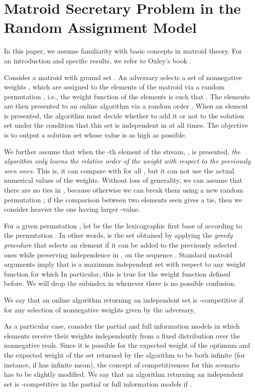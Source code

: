 \documentclass[letterpaper,11pt]{article}
\theoremstyle{definition}
\theoremstyle{remark}
\begin{document}
\section{Matroid Secretary Problem in the Random Assignment Model}\label{section2}

In this paper, we assume familiarity with basic concepts in matroid theory. For an introduction and specific results, we refer to Oxley's book \cite{oxley2006matroid}.

Consider a matroid  with ground set . An adversary selects a set  of  nonnegative weights , which are assigned to the elements of the matroid via a random permutation , i.e., the weight function of the elements  is such that . The elements are then presented to an online algorithm via a random order . When an element is presented, the algorithm must decide whether to add it or not to the solution set under the condition that this set is independent in  at all times. The objective is to output a solution set  whose value  is as high as possible.

We further assume that when the -th element of the stream, , is presented, \emph{the algorithm only learns the relative order of the weight with respect to the previously seen ones}. This is, it can compare  with  for all , but it can not use the actual numerical values of the weights. Without loss of generality, we can assume that there are no ties in , because otherwise we can break them using a new random permutation ; if the comparison between two elements seen gives a tie, then we consider heavier the one having larger -value.

For a given permutation , let  be the the lexicographic first base of  according to the permutation . In other words,  is the set obtained by applying the \emph{greedy procedure} that selects an element if it can be added to the previously selected ones while preserving independence in , on the sequence . Standard matroid arguments imply that  is a maximum independent set with respect to any weight function  for which  In particular, this is true for the weight function  defined before. We will drop the subindex  in  whenever there is no possible confusion.

We say that an online algorithm returning an independent set  is -competitive if for any selection of nonnegative weights  given by the adversary, 


As a particular case, consider the partial and full information models in which elements receive their weights independently from a fixed distribution  over the nonnegative reals. Since it is possible for the expected weight of the optimum and the expected weight of the set returned by the algorithm to be both infinite (for instance, if  has infinite mean), the concept of competitiveness for this scenario has to be slightly modified. We say that an algorithm returning an independent set  is -competitive in the partial or full information models if .
\end{document}
